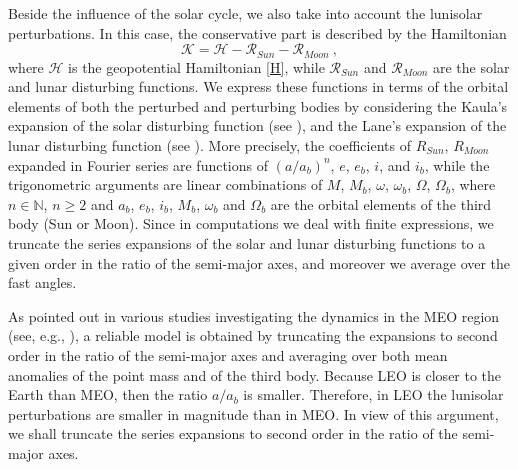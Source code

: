 \documentclass[12pt,reqno]{amsart}
\numberwithin{equation}{section}
\begin{document}
Beside the influence of the solar cycle, we also take into account the lunisolar perturbations. In this case, the conservative part is described by the Hamiltonian
$$
\mathcal{K}=\mathcal{H}
-\mathcal{R}_{Sun}-\mathcal{R}_{Moon}\ ,
$$
where $\mathcal{H}$ is the geopotential Hamiltonian \eqref{H}, while $\mathcal{R}_{Sun}$ and $\mathcal{R}_{Moon}$ are the solar and lunar disturbing functions. We express these functions in terms of the orbital elements of both the perturbed and perturbing bodies by
considering the Kaula's expansion of the solar disturbing function (see \cite{Kaula1962}), and  the Lane's expansion of the lunar disturbing function
(see \cite{Lane1989, CGPR2016}). More precisely, the coefficients of $R_{Sun}$, $R_{Moon}$
expanded in Fourier series are functions of $(a/a_b)^n$, $e$, $e_b$, $i$, and $i_b$, while the trigonometric arguments are linear combinations of  $M$, $M_b$, $\omega$, $\omega_b$, $\Omega$, $\Omega_b$, where $n \in \mathbb{N}$, $n \geq 2$ and $a_b$, $e_b$, $i_b$, $M_b$, $\omega_b$ and $\Omega_b$ are the orbital elements of  the third body (Sun or Moon).  Since in computations we deal with finite expressions, we truncate the series expansions of the solar and lunar disturbing functions to a given order in the ratio of
the semi-major axes, and moreover we average over the fast angles.

As pointed out in various studies investigating the dynamics in the MEO region (see, e.g.,
\cite{CGfrontier, CGPbif, DRADVR15, CGPR2016, GDGR2016}), a reliable model is obtained by truncating the expansions to second order in the ratio of
the semi-major axes and averaging over both mean anomalies of the point mass and of the third body. Because LEO is closer to the Earth than MEO, then the ratio $a/a_b$ is smaller. Therefore, in LEO the lunisolar perturbations are smaller in magnitude than in MEO. In view of this argument, we shall truncate the series expansions to second order in the ratio of
the semi-major axes.
\end{document}
